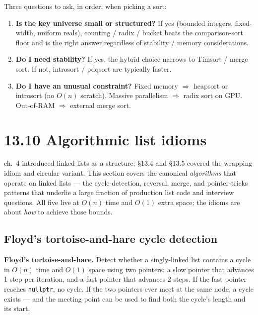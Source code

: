 \documentclass[11pt]{article}
\begin{document}
\begin{notebox}
Three questions to ask, in order, when picking a sort:

\begin{enumerate}
    \item \textbf{Is the key universe small or structured?} If
          yes (bounded integers, fixed-width, uniform reals),
          counting / radix / bucket beats the comparison-sort
          floor and is the right answer regardless of stability /
          memory considerations.
    \item \textbf{Do I need stability?} If yes, the hybrid choice
          narrows to Timsort / merge sort. If not, introsort /
          pdqsort are typically faster.
    \item \textbf{Do I have an unusual constraint?} Fixed memory
          $\Rightarrow$ heapsort or introsort (no $O(n)$ scratch).
          Massive parallelism $\Rightarrow$ radix sort on GPU.
          Out-of-RAM $\Rightarrow$ external merge sort.
\end{enumerate}
\end{notebox}

\section{13.10 Algorithmic list idioms}

ch.~4 introduced linked lists as a structure; \S13.4 and \S13.5
covered the wrapping idiom and circular variant. This section
covers the canonical \emph{algorithms} that operate on linked
lists --- the cycle-detection, reversal, merge, and pointer-tricks
patterns that underlie a large fraction of production list code
and interview questions. All five live at $O(n)$ time and $O(1)$
extra space; the idioms are about \emph{how} to achieve those
bounds.

\subsection*{Floyd's tortoise-and-hare cycle detection}

\begin{defnbox}
\textbf{Floyd's tortoise-and-hare.} Detect whether a singly-linked
list contains a cycle in $O(n)$ time and $O(1)$ space using two
pointers: a slow pointer that advances 1 step per iteration, and
a fast pointer that advances 2 steps. If the fast pointer reaches
\texttt{nullptr}, no cycle. If the two pointers ever meet at the
same node, a cycle exists --- and the meeting point can be used
to find both the cycle's length and its start.
\end{defnbox}
\end{document}
